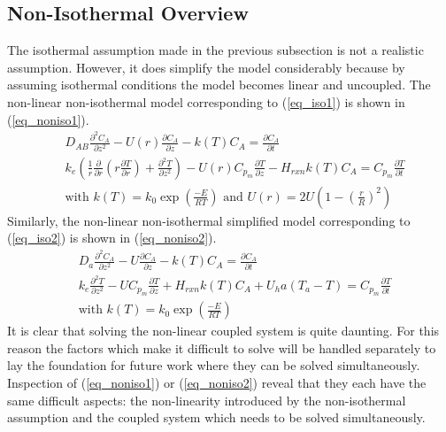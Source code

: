 \documentclass[11pt,fleqn]{article}
\theoremstyle{defstyle}
\begin{document}
\subsection{Non-Isothermal Overview}
The isothermal assumption made in the previous subsection is not a realistic assumption. However, it does simplify the model considerably because by assuming isothermal conditions the model becomes linear and uncoupled. The non-linear non-isothermal model corresponding to (\ref{eq_iso1}) is shown in (\ref{eq_noniso1}).
\begin{equation}
\begin{aligned}
&D_{AB} \frac{\partial^2 C_A}{\partial z^2} - U(r) \frac{\partial C_A}{\partial z} - k(T)C_A 
= \frac{\partial C_A}{\partial t} \\
& k_e(\frac{1}{r}\frac{\partial}{\partial r}(r\frac{\partial T}{\partial r}) + \frac{\partial ^2 T}{\partial z^2}) - U(r) C_{p_m} \frac{\partial T}{\partial z} - H_{rxn}k(T)C_A = C_{p_m} \frac{\partial T}{\partial t} \\
&\text{with } k(T) = k_0 \exp(\frac{-E}{RT}) \text{ and } U(r)=2U(1-(\frac{r}{R})^2)
\end{aligned}
\label{eq_noniso1}
\end{equation} 
Similarly, the non-linear non-isothermal simplified model corresponding to (\ref{eq_iso2}) is shown in (\ref{eq_noniso2}).
\begin{equation}
\begin{aligned}
&D_a \frac{\partial^2 C_A}{\partial z^2} - U \frac{\partial C_A}{\partial z} - k(T)C_A 
= \frac{\partial C_A}{\partial t} \\
& k_e\frac{\partial^2 T}{\partial z^2}- U C_{p_m} \frac{\partial T}{\partial z} + H_{rxn}k(T)C_A  + U_ha(T_a-T) = C_{p_m} 
\frac{\partial T}{\partial t} \\
&\text{with } k(T) = k_0 \exp(\frac{-E}{RT})
\end{aligned}
\label{eq_noniso2}
\end{equation} 
It is clear that solving the non-linear coupled system is quite daunting. For this reason the factors which make it difficult to solve will be handled separately to lay the foundation for future work where they can be solved simultaneously. Inspection of (\ref{eq_noniso1}) or (\ref{eq_noniso2}) reveal that they each have the same difficult aspects: the non-linearity introduced by the non-isothermal assumption and the coupled system which needs to be solved simultaneously.
\end{document}
